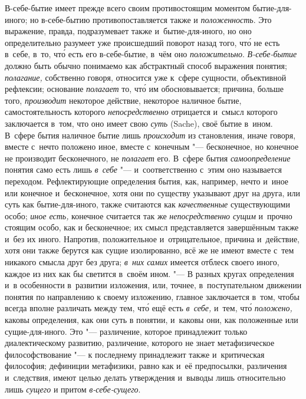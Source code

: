 В-себе-бытие имеет прежде всего своим противостоящим моментом
бытие-для-иного; но в-себе-бытию противопоставляется также и
{\em положенность}. Это выражение, правда,
подразумевает также и~бытие-для-иного, но оно определительно разумеет уже
происшедший поворот назад того, чт\'{о} не есть в~себе, в~то, чт\'{о} есть его
в-себе-бытие, в~чём оно {\em положительно}.
{\em В-себе-бытие} должно быть обычно понимаемо как
абстрактный способ выражения понятия; {\em полагание,}
собственно говоря, относится уже к~сфере сущности, объективной рефлексии;
основание {\em полагает} то, чт\'{о} им обосновывается;
причина, больше того, {\em производит} некоторое
действие, некоторое наличное бытие, самостоятельность которого
{\em непосредственно} отрицается и~смысл которого
заключается в~том, что оно имеет свою {\em суть}
(Sache), своё бытие в~ином. В~сфере бытия наличное бытие лишь
{\em происходит} из становления, иначе говоря, вместе с~нечто
положено иное, вместе с~конечным "--- бесконечное, но конечное не
производит бесконечного, не {\em полагает} его. В~сфере
бытия {\em самоопределение} понятия само есть лишь
{\em в~себе} "--- и~соответственно с~этим оно называется
переходом. Рефлектирующие определения бытия, как, например, нечто и~иное
или конечное и~бесконечное, хотя они по существу указывают друг на друга,
или суть как бытие-для-иного, также считаются как
{\em качественные} существующими особо;
{\em иное есть,} конечное считается так же
{\em непосредственно сущим} и~прочно стоящим особо, как
и бесконечное; их смысл представляется завершённым также и~без их иного.
Напротив, положительное и~отрицательное, причина и~действие, хотя они также
берутся как сущие изолированно, всё же не имеют вместе с~тем никакого
смысла друг без друга; {\em в~них самих} имеется
отблеск своего иного, каждое из них как бы светится в~своём ином. "--- В
разных кругах определения и~в особенности в~развитии
изложения, или, точнее, в~поступательном движении понятия по направлению к
своему изложению, главное заключается в~том, чтобы всегда вполне различать
между тем, чт\'{о} ещё есть {\em в~себе,} и~тем, чт\'{о}
{\em положено,} каковы определения, как они суть в
понятии, и~каковы они, как положенные или сущие-для-иного. Это
"--- различение, которое принадлежит только диалектическому развитию,
различение, которого не знает метафизическое философствование "--- к
последнему принадлежит также и~критическая философия; дефиниции метафизики,
равно как и~её предпосылки, различения и~следствия, имеют целью делать
утверждения и~выводы лишь относительно лишь {\em сущего} и
притом {\em в-себе-сущего}.

